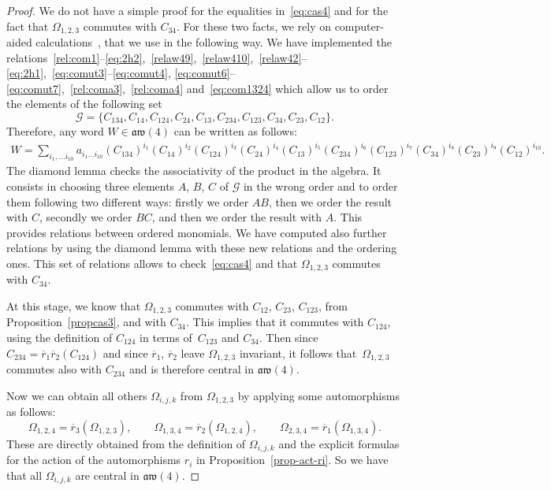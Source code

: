 \documentclass[10pt,a4paper]{amsart}
\numberwithin{equation}{section}
\newcommand{\cG}{\mathcal{G}}
\theoremstyle{definition}
\newcommand{\rb}{\overline{r}}
\begin{document}
\begin{proof}
We do not have a simple proof for the equalities in~\eqref{eq:cas4} and for the fact that $\varOmega_{1,2,3}$ commutes with $C_{34}$.
For these two facts, we rely on computer-aided calculations~\cite{form}, that we use in the following way.
We have implemented the relations~\eqref{rel:com1}--\eqref{eq:2h2},~\eqref{relaw49},~\eqref{relaw410},~\eqref{relaw42}--\eqref{eq:2h1},~\eqref{eq:comut3}--\eqref{eq:comut4},
\eqref{eq:comut6}--\eqref{eq:comut7},~\eqref{rel:coma3},~\eqref{rel:coma4} and~\eqref{eq:com1324} which allow us to order the elements of the following set
\[\cG=\{C_{134}, C_{14}, C_{124}, C_{24}, C_{13}, C_{234}, C_{123}, C_{34}, C_{23},C_{12}\}.\]
Therefore, any word $W\in \mathfrak{aw}(4)$ can be written as follows:
\begin{gather*}
 W\!= \!\!\!\sum_{i_1,\dots i_{10}}\!\!\! a_{i_1\dots i_{10} }(C_{134})^{i_1} (C_{14})^{i_2} (C_{124})^{i_3} (C_{24})^{i_4} (C_{13})^{i_5} (C_{234})^{i_6} (C_{123})^{i_7} (C_{34})^{i_8} (C_{23})^{i_9} (C_{12})^{i_{10}}.
\end{gather*}
The diamond lemma checks the associativity of the product in the algebra. It consists in choosing three elements $A$, $B$, $C$ of $\cG$ in the wrong order and to order them following two different ways:
firstly we order $AB$, then we order the result with $C$, secondly we order $BC$, and then we order the result with $A$.
This provides relations between ordered monomials. We have computed also further relations by using the diamond lemma with these new relations and the ordering ones.
This set of relations allows to check~\eqref{eq:cas4} and that $\varOmega_{1,2,3}$ commutes with $C_{34}$.


At this stage, we know that $\varOmega_{1,2,3}$ commutes with $C_{12}$, $C_{23}$, $C_{123}$, from Proposition~\ref{propcas3}, and with $C_{34}$. This implies that it commutes with $C_{124}$, using the definition of $C_{124}$ in terms of~$C_{123}$ and $C_{34}$. Then since $C_{234}=\rb_1\rb_2(C_{124})$ and since $\rb_1$, $\rb_2$ leave $\varOmega_{1,2,3}$ invariant, it follows that~$\varOmega_{1,2,3}$ commutes also with $C_{234}$
and is therefore central in $\mathfrak{aw}(4)$.

Now we can obtain all others $\varOmega_{i,j,k}$ from $\varOmega_{1,2,3}$ by applying some automorphisms as follows:
\[\varOmega_{1,2,4}=\rb_3(\varOmega_{1,2,3}) ,\qquad \varOmega_{1,3,4}=\rb_2(\varOmega_{1,2,4}) ,\qquad \varOmega_{2,3,4}=\rb_1(\varOmega_{1,3,4}) .\]
These are directly obtained from the definition of $\varOmega_{i,j,k}$ and the explicit formulas for the action of the automorphisms $r_i$ in Proposition~\ref{prop-act-ri}. So we have that all $\varOmega_{i,j,k}$ are central in $\mathfrak{aw}(4)$.


\end{proof}
\end{document}
